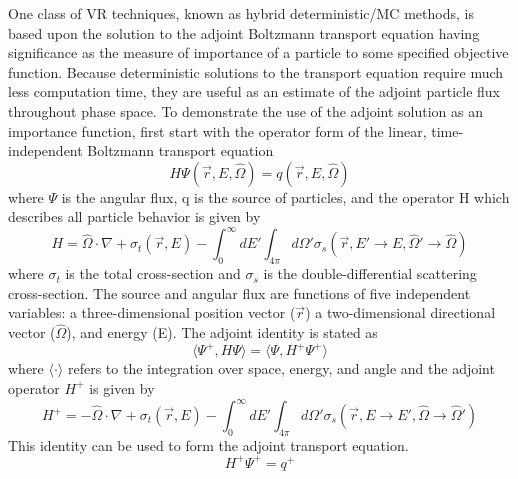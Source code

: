One class of VR techniques, known as hybrid deterministic/MC methods,
is based upon the solution to the adjoint Boltzmann transport equation having
significance as the measure of importance of a particle to some specified
objective function.  
Because deterministic solutions to the transport equation %
require much less computation time, they are useful as an estimate of the
adjoint particle flux throughout phase space.  
To demonstrate the use of the adjoint solution as an importance function,
first start with the operator form of the linear, time-independent Boltzmann transport
equation \cite{l_m}
\begin{equation} \label{eq:3.1a}
	H\Psi(\overrightarrow{r}, E,\widehat{\Omega})  = q(\overrightarrow{r}, E,\widehat{\Omega})
\end{equation}
where $\Psi$ is the angular flux, q is the source of particles, and the operator H
which describes all particle behavior is given by
\begin{equation} \label{eq:3.1b}
		H = \widehat{\Omega} \cdot \nabla +
		    \sigma_{t}(\overrightarrow{r},E) - 
			\int_{0}^{\infty} dE'
			\int_{4\pi} d\Omega'
			\sigma_{s}( \overrightarrow{r}, E' 
			\rightarrow E, \widehat{\Omega}' 
			\rightarrow \widehat{\Omega} )
\end{equation}
where $\sigma_{t}$ is the total cross-section and $\sigma_{s}$ is the
double-differential scattering cross-section.  The source and angular flux are
functions of five independent variables: a three-dimensional position vector ($\overrightarrow{r}$) 
a two-dimensional directional vector ($\widehat{\Omega}$), and energy (E).
The adjoint identity is stated as
\begin{equation} \label{eq:3.2}
		\langle \Psi^{+} , H\Psi \rangle =
		\langle \Psi, H^{+}\Psi^{+} \rangle
\end{equation}
where $ \langle \cdot \rangle$ refers to the integration over space,
energy, and angle and the adjoint operator $H^{+}$ is given by
\begin{equation} \label{eq:3.2b}
		H^{+} = -\widehat{\Omega} \cdot \nabla +
		    \sigma_{t}(\overrightarrow{r},E) - 
			\int_{0}^{\infty} dE'
			\int_{4\pi} d\Omega'
			\sigma_{s}( \overrightarrow{r}, E 
			\rightarrow E', \widehat{\Omega} 
			\rightarrow \widehat{\Omega}' )
\end{equation}
This identity can be used to form the adjoint transport equation.
\begin{equation} \label{eq:3.3}
		H^{+}\Psi^{+} = q^{+}
\end{equation}


